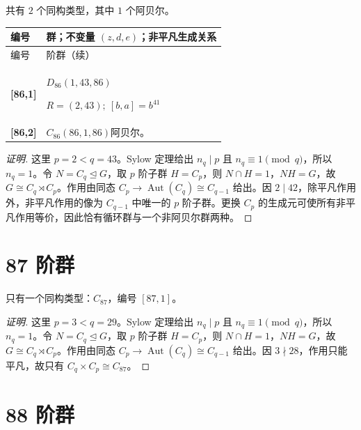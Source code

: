 \documentclass[UTF8,fontset=fandol,11pt,a4paper]{ctexart}
\newcommand{\Aut}{\operatorname{Aut}}\newcommand{\GL}{\operatorname{GL}}\newcommand{\ord}{\operatorname{ord}}\newcommand{\Z}{\mathrm Z}
\begin{document}
共有 $2$ 个同构类型，其中 $1$ 个阿贝尔。

\begingroup\small\setlength{\tabcolsep}{3pt}\renewcommand{\arraystretch}{1.12}

\begin{longtable}{@{}p{17mm}>{\raggedright\arraybackslash}p{141mm}@{}}

\toprule 编号 & 群；不变量 $(z,d,e)$；非平凡生成关系\\\midrule\endfirsthead

\toprule 编号 & 86 阶群（续）\\\midrule\endhead\bottomrule\endfoot

\textbf{[86,1]} & $D_{86}$\quad $(1,43,86)$\par\(R=(2,43);\allowbreak\ [b,a]=b^{41}\)\\[3pt]

\textbf{[86,2]} & $C_{86}$\quad $(86,1,86)$\quad 阿贝尔。\\[3pt]

\end{longtable}\endgroup

\begin{proof}[证明]
这里 $p=2<q=43$。Sylow 定理给出 $n_q\mid p$ 且 $n_q\equiv1\pmod q$，所以 $n_q=1$。令 $N=C_q\trianglelefteq G$，取 $p$ 阶子群 $H=C_p$，则 $N\cap H=1$，$NH=G$，故 $G\cong C_q\rtimes C_p$。作用由同态 $C_p\to\Aut(C_q)\cong C_{q-1}$ 给出。因 $2\mid 42$，除平凡作用外，非平凡作用的像为 $C_{q-1}$ 中唯一的 $p$ 阶子群。更换 $C_p$ 的生成元可使所有非平凡作用等价，因此恰有循环群与一个非阿贝尔群两种。
\end{proof}

\section*{87 阶群}\label{order:87}

只有一个同构类型：$C_{87}$，编号 $[87,1]$。

\begin{proof}[证明]
这里 $p=3<q=29$。Sylow 定理给出 $n_q\mid p$ 且 $n_q\equiv1\pmod q$，所以 $n_q=1$。令 $N=C_q\trianglelefteq G$，取 $p$ 阶子群 $H=C_p$，则 $N\cap H=1$，$NH=G$，故 $G\cong C_q\rtimes C_p$。作用由同态 $C_p\to\Aut(C_q)\cong C_{q-1}$ 给出。因 $3\nmid 28$，作用只能平凡，故只有 $C_q\times C_p\cong C_{87}$。
\end{proof}

\section*{88 阶群}\label{order:88}
\end{document}
